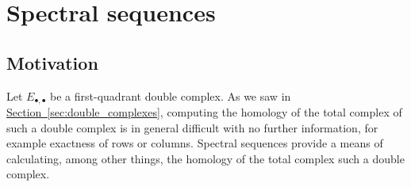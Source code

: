 \documentclass[main.tex]{subfiles}
\begin{document}
\chapter{Spectral sequences}
\label{ch:spectral_sequences}

\section{Motivation}
\label{sec:motivation}

Let $E_{\bullet,\bullet}$ be a first-quadrant double complex. As we saw in \hyperref[sec:double_complexes]{Section~\ref*{sec:double_complexes}}, computing the homology of the total complex of such a double complex is in general difficult with no further information, for example exactness of rows or columns. Spectral sequences provide a means of calculating, among other things, the homology of the total complex such a double complex.
\end{document}
